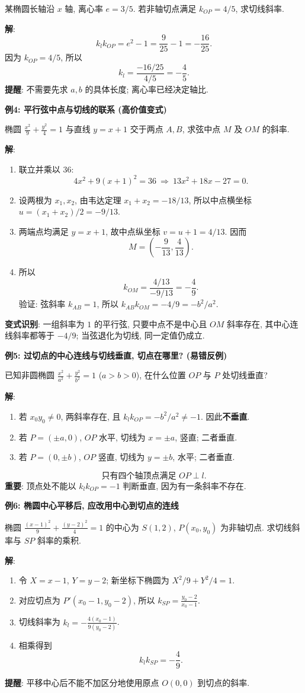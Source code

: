 \begin{examplebox}
某椭圆长轴沿 $x$ 轴, 离心率 $e=3/5$.
若非轴切点满足 $k_{OP}=4/5$, 求切线斜率.

\textbf{解}:
\[
k_lk_{OP}=e^2-1=\frac9{25}-1=-\frac{16}{25}.
\]
因为 $k_{OP}=4/5$, 所以
\[
\boxed{k_l=\frac{-16/25}{4/5}=-\frac45.}
\]
\textbf{提醒}: 不需要先求 $a,b$ 的具体长度; 离心率已经决定轴比.

\medskip
\textbf{例4: 平行弦中点与切线的联系 (高价值变式)}

椭圆 $\frac{x^2}{9}+\frac{y^2}{4}=1$ 与直线 $y=x+1$
交于两点 $A,B$, 求弦中点 $M$ 及 $OM$ 的斜率.

\textbf{解}:
\begin{enumerate}
  \item 联立并乘以 $36$:
  \[
  4x^2+9(x+1)^2=36
  \ \Longrightarrow\ 13x^2+18x-27=0.
  \]
  \item 设两根为 $x_1,x_2$, 由韦达定理
  $x_1+x_2=-18/13$, 所以中点横坐标
  $u=(x_1+x_2)/2=-9/13$.
  \item 两端点均满足 $y=x+1$, 故中点纵坐标
  $v=u+1=4/13$. 因而
  \[
  M=\left(-\frac9{13},\frac4{13}\right).
  \]
  \item 所以
  \[
  \boxed{k_{OM}=\frac{4/13}{-9/13}=-\frac49.}
  \]
  验证: 弦斜率 $k_{AB}=1$, 所以
  $k_{AB}k_{OM}=-4/9=-b^2/a^2$.
\end{enumerate}
\textbf{变式识别}: 一组斜率为 $1$ 的平行弦, 只要中点不是中心且 $OM$ 斜率存在,
其中心连线斜率都等于 $-4/9$; 当弦退化为切线, 同一定值仍成立.

\medskip
\textbf{例5: 过切点的中心连线与切线垂直, 切点在哪里? (易错反例)}

已知非圆椭圆 $\frac{x^2}{a^2}+\frac{y^2}{b^2}=1$ ($a>b>0$),
在什么位置 $OP$ 与 $P$ 处切线垂直?

\textbf{解}:
\begin{enumerate}
  \item 若 $x_0y_0\ne0$, 两斜率存在, 且
  $k_lk_{OP}=-b^2/a^2\ne-1$. 因此\textbf{不垂直}.
  \item 若 $P=(\pm a,0)$, $OP$ 水平, 切线为 $x=\pm a$, 竖直; 二者垂直.
  \item 若 $P=(0,\pm b)$, $OP$ 竖直, 切线为 $y=\pm b$, 水平; 二者垂直.
\end{enumerate}
\[
\boxed{\text{只有四个轴顶点满足 }OP\perp l.}
\]
\textbf{重要}: 顶点处不能以 $k_lk_{OP}=-1$ 判断垂直, 因为有一条斜率不存在.

\medskip
\textbf{例6: 椭圆中心平移后, 应改用中心到切点的连线}

椭圆 $\frac{(x-1)^2}{9}+\frac{(y-2)^2}{4}=1$
的中心为 $S(1,2)$, $P(x_0,y_0)$ 为非轴切点.
求切线斜率与 $SP$ 斜率的乘积.

\textbf{解}:
\begin{enumerate}
  \item 令 $X=x-1$, $Y=y-2$; 新坐标下椭圆为 $X^2/9+Y^2/4=1$.
  \item 对应切点为 $P'(x_0-1,y_0-2)$,
  所以 $k_{SP}=\frac{y_0-2}{x_0-1}$.
  \item 切线斜率为
  $k_l=-\frac{4(x_0-1)}{9(y_0-2)}$.
  \item 相乘得到
  \[
  \boxed{k_lk_{SP}=-\frac49.}
  \]
\end{enumerate}
\textbf{提醒}: 平移中心后不能不加区分地使用原点 $O(0,0)$ 到切点的斜率.
\end{examplebox}
